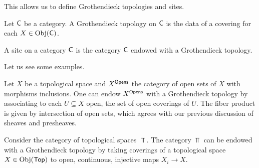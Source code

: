 This allows us to define Grothendieck topologies and sites. 
\begin{definition}\label{def: Grothendieck topology}
    Let $\mathsf{C}$ be a category. A Grothendieck topology on $\mathsf{C}$ is the data of a covering for each $X\in\mathrm{Obj}(\mathsf{C})$.
\end{definition}
\begin{definition}[Site]\label{def: site}
    A site on a category $\mathsf{C}$ is the category $\mathsf{C}$ endowed with a Grothendieck topology. 
\end{definition}
Let us see some examples.
\begin{example}
    Let $X$ be a topological space and $X^{\mathsf{Opens}}$ the category of open sets of $X$ with morphisms inclusions. One can endow $X^{\mathsf{Opens}}$ with a Grothendieck topology by associating to each $U\subseteq X$ open, the set of open coverings of $U$. The fiber product is given by intersection of open sets, which agrees with our previous discussion of sheaves and presheaves. 
\end{example}
\begin{example}\label{ex: global topology}
    Consider the category of topological spaces $\Top$. The category $\Top$ can be endowed with a Grothendieck topology by taking coverings of a topological space $X\in\mathrm{Obj}(\mathsf{Top})$ to open, continuous, injective maps $X_{i}\to X$. 
\end{example}
